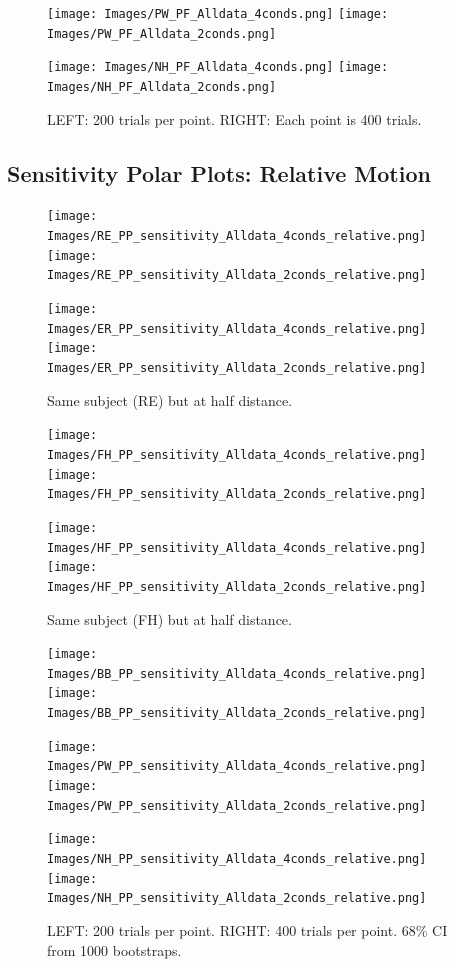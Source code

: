 \documentclass[11pt]{article} %
\begin{document}
\begin{figure}[H]
\centering %
\texttt{[image: Images/PW\_PF\_Alldata\_4conds.png]}
\texttt{[image: Images/PW\_PF\_Alldata\_2conds.png]}
\end{figure}
\begin{figure}[H]
\centering %
\texttt{[image: Images/NH\_PF\_Alldata\_4conds.png]}
\texttt{[image: Images/NH\_PF\_Alldata\_2conds.png]}
\caption{LEFT: 200 trials per point. RIGHT: Each point is 400 trials.}
\end{figure}

\newpage
\subsection{Sensitivity Polar Plots: Relative Motion}
\begin{figure}[H]
\centering %
\texttt{[image: Images/RE\_PP\_sensitivity\_Alldata\_4conds\_relative.png]}
\texttt{[image: Images/RE\_PP\_sensitivity\_Alldata\_2conds\_relative.png]}
\end{figure}
\begin{figure}[H]
\centering %
\texttt{[image: Images/ER\_PP\_sensitivity\_Alldata\_4conds\_relative.png]}
\texttt{[image: Images/ER\_PP\_sensitivity\_Alldata\_2conds\_relative.png]}
\caption{Same subject (RE) but at half distance.}
\end{figure}
\begin{figure}[H]
\centering %
\texttt{[image: Images/FH\_PP\_sensitivity\_Alldata\_4conds\_relative.png]}
\texttt{[image: Images/FH\_PP\_sensitivity\_Alldata\_2conds\_relative.png]}
\end{figure}
\begin{figure}[H]
\centering %
\texttt{[image: Images/HF\_PP\_sensitivity\_Alldata\_4conds\_relative.png]}
\texttt{[image: Images/HF\_PP\_sensitivity\_Alldata\_2conds\_relative.png]}
\caption{Same subject (FH) but at half distance.}
\end{figure}
\begin{figure}[H]
\centering %
\texttt{[image: Images/BB\_PP\_sensitivity\_Alldata\_4conds\_relative.png]}
\texttt{[image: Images/BB\_PP\_sensitivity\_Alldata\_2conds\_relative.png]}
\end{figure}
\begin{figure}[H]
\centering %
\texttt{[image: Images/PW\_PP\_sensitivity\_Alldata\_4conds\_relative.png]}
\texttt{[image: Images/PW\_PP\_sensitivity\_Alldata\_2conds\_relative.png]}
\end{figure}
\begin{figure}[H]
\centering %
\texttt{[image: Images/NH\_PP\_sensitivity\_Alldata\_4conds\_relative.png]}
\texttt{[image: Images/NH\_PP\_sensitivity\_Alldata\_2conds\_relative.png]}
\caption{LEFT: 200 trials per point. RIGHT: 400 trials per point. 68\% CI from 1000 bootstraps.}
\end{figure}
\end{document}
